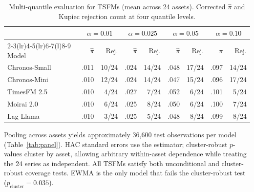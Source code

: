 \documentclass[preprint,11pt,authoryear]{elsarticle}
\newcommand{\1}{\boldsymbol{1}}
\begin{document}
	\begin{table}[H]
		\centering
		\caption{Multi-quantile evaluation for TSFMs (mean across 24 assets). Corrected $\hat\pi$ and Kupiec rejection count at four quantile levels.}
		\label{tab:multiquantile}
		\footnotesize
		\begin{tabular}{@{}l rr rr rr rr@{}}
			\toprule
			& \multicolumn{2}{c}{$\alpha=0.01$} & \multicolumn{2}{c}{$\alpha=0.025$} & \multicolumn{2}{c}{$\alpha=0.05$} & \multicolumn{2}{c}{$\alpha=0.10$} \\
			\cmidrule(lr){2-3}\cmidrule(lr){4-5}\cmidrule(lr){6-7}\cmidrule(l){8-9}
			Model & $\hat\pi$ & Rej. & $\hat\pi$ & Rej. & $\hat\pi$ & Rej. & $\hat\pi$ & Rej. \\
			\midrule
			Chronos-Small  & .011 & 10/24 & .024 & 14/24 & .048 & 17/24 & .097 & 14/24 \\
			Chronos-Mini   & .010 & 12/24 & .024 & 14/24 & .047 & 15/24 & .096 & 17/24 \\
			TimesFM 2.5    & .010 &  4/24 & .027 &  7/24 & .052 &  6/24 & .101 &  5/24 \\
			Moirai 2.0     & .010 &  6/24 & .025 &  8/24 & .050 &  6/24 & .100 &  7/24 \\
			Lag-Llama      & .010 &  3/24 & .025 &  5/24 & .048 &  8/24 & .099 &  8/24 \\
			\bottomrule
		\end{tabular}
	\end{table}
	
	Pooling across assets yields approximately 36,600 test
	observations per model (Table~\ref{tab:panel}). HAC standard
	errors use the \citet{newey1987simple} estimator;
	cluster-robust $p$-values cluster by asset, allowing arbitrary
	within-asset dependence while treating the 24 series as
	independent. All TSFMs
	satisfy both unconditional and cluster-robust coverage tests.
	EWMA is the only model that fails the cluster-robust test
	($p_{\text{cluster}} = 0.035$).
	
\end{document}
